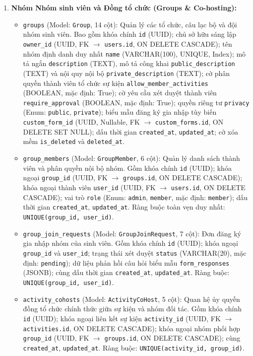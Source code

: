 \begin{enumerate}
    \item \textbf{Nhóm Nhóm sinh viên và Đồng tổ chức (Groups \& Co-hosting):}
    \begin{itemize}
        \item \texttt{groups} (Model: \texttt{Group}, 14 cột): Quản lý các tổ chức, câu lạc bộ và đội nhóm sinh viên. Bao gồm khóa chính \texttt{id} (UUID); chủ sở hữu sáng lập \texttt{owner\_id} (UUID, FK $\rightarrow$ \texttt{users.id}, ON DELETE CASCADE); tên nhóm định danh duy nhất \texttt{name} (VARCHAR(100), UNIQUE, Index); mô tả ngắn \texttt{description} (TEXT), mô tả công khai \texttt{public\_description} (TEXT) và nội quy nội bộ \texttt{private\_description} (TEXT); cờ phân quyền thành viên tổ chức sự kiện \texttt{allow\_member\_activities} (BOOLEAN, mặc định: True); cờ yêu cầu xét duyệt thành viên \texttt{require\_approval} (BOOLEAN, mặc định: True); quyền riêng tư \texttt{privacy} (Enum: \texttt{public}, \texttt{private}); biểu mẫu đăng ký gia nhập tùy biến \texttt{custom\_form\_id} (UUID, Nullable, FK $\rightarrow$ \texttt{custom\_forms.id}, ON DELETE SET NULL); dấu thời gian \texttt{created\_at}, \texttt{updated\_at}; cờ xóa mềm \texttt{is\_deleted} và \texttt{deleted\_at}.
        \item \texttt{group\_members} (Model: \texttt{GroupMember}, 6 cột): Quản lý danh sách thành viên và phân quyền nội bộ nhóm. Gồm khóa chính \texttt{id} (UUID); khóa ngoại \texttt{group\_id} (UUID, FK $\rightarrow$ \texttt{groups.id}, ON DELETE CASCADE); khóa ngoại thành viên \texttt{user\_id} (UUID, FK $\rightarrow$ \texttt{users.id}, ON DELETE CASCADE); vai trò \texttt{role} (Enum: \texttt{admin}, \texttt{member}, mặc định: \texttt{member}); dấu thời gian \texttt{created\_at}, \texttt{updated\_at}. Ràng buộc toàn vẹn duy nhất: \texttt{UNIQUE(group\_id, user\_id)}.
        \item \texttt{group\_join\_requests} (Model: \texttt{GroupJoinRequest}, 7 cột): Đơn đăng ký gia nhập nhóm của sinh viên. Gồm khóa chính \texttt{id} (UUID); khóa ngoại \texttt{group\_id} và \texttt{user\_id}; trạng thái xét duyệt \texttt{status} (VARCHAR(20), mặc định: \texttt{pending}); dữ liệu phản hồi câu hỏi biểu mẫu \texttt{form\_responses} (JSONB); cùng dấu thời gian \texttt{created\_at}, \texttt{updated\_at}. Ràng buộc: \texttt{UNIQUE(group\_id, user\_id)}.
        \item \texttt{activity\_cohosts} (Model: \texttt{ActivityCoHost}, 5 cột): Quan hệ ủy quyền đồng tổ chức chính thức giữa sự kiện và nhóm đối tác. Gồm khóa chính \texttt{id} (UUID); khóa ngoại liên kết sự kiện \texttt{activity\_id} (UUID, FK $\rightarrow$ \texttt{activities.id}, ON DELETE CASCADE); khóa ngoại nhóm phối hợp \texttt{group\_id} (UUID, FK $\rightarrow$ \texttt{groups.id}, ON DELETE CASCADE); cùng \texttt{created\_at}, \texttt{updated\_at}. Ràng buộc: \texttt{UNIQUE(activity\_id, group\_id)}.

\end{itemize}
\end{enumerate}
